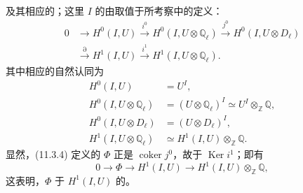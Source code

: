 及其相应的；这里 $I$ 的由取值于所考察中的定义：
\begin{equation}\tag{11.3.7}
 \begin{aligned}
 0&\longrightarrow H^0(I,U)\xrightarrow{i^0}H^0(I,U\otimes\mathbb Q_\ell)
 \xrightarrow{j^0}H^0(I,U\otimes D_\ell)\\
 &\xrightarrow{\partial}H^1(I,U)\xrightarrow{i^1}H^1(I,U\otimes\mathbb Q_\ell).
 \end{aligned}
\end{equation}
其中相应的自然认同为
\[
 \begin{aligned}
 H^0(I,U)&=U^I,\\
 H^0(I,U\otimes\mathbb Q_\ell)&=(U\otimes\mathbb Q_\ell)^I
 \simeq U^I\otimes_{\mathbb Z}\mathbb Q,\\
 H^0(I,U\otimes D_\ell)&=(U\otimes D_\ell)^I,\\
 H^1(I,U\otimes\mathbb Q_\ell)&\simeq H^1(I,U)\otimes_{\mathbb Z}\mathbb Q.
 \end{aligned}
\]
显然，(11.3.4) 定义的 $\Phi$ 正是 $\operatorname{coker}j^0$，故于 $\operatorname{Ker}i^1$；即有
\begin{equation}\tag{11.3.8}
 0\longrightarrow\Phi\longrightarrow H^1(I,U)
 \longrightarrow H^1(I,U)\otimes_{\mathbb Z}\mathbb Q,
\end{equation}
这表明，$\Phi$ 于 $H^1(I,U)$ 的。

